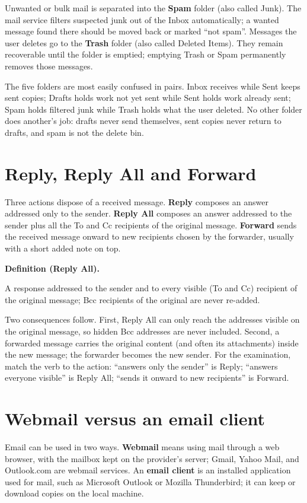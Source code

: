 \documentclass[11pt]{article}
\newenvironment{definitionbox}[1]{%
  \par\noindent\textbf{Definition (#1).}\ \itshape
}{\par\vspace{0.3em}}
\begin{document}
Unwanted or bulk mail is separated into the \textbf{Spam} folder (also called
Junk). The mail service filters suspected junk out of the Inbox automatically;
a wanted message found there should be moved back or marked ``not spam''.
Messages the user deletes go to the \textbf{Trash} folder (also called Deleted
Items). They remain recoverable until the folder is emptied; emptying Trash
or Spam permanently removes those messages.

The five folders are most easily confused in pairs. Inbox receives while Sent
keeps sent copies; Drafts holds work not yet sent while Sent holds work
already sent; Spam holds filtered junk while Trash holds what the user deleted.
No other folder does another's job: drafts never send themselves, sent copies
never return to drafts, and spam is not the delete bin.

\section{Reply, Reply All and Forward}
Three actions dispose of a received message. \textbf{Reply} composes an answer
addressed only to the sender. \textbf{Reply All} composes an answer addressed
to the sender plus all the To and Cc recipients of the original message.
\textbf{Forward} sends the received message onward to new recipients chosen
by the forwarder, usually with a short added note on top.

\begin{definitionbox}{Reply All}
A response addressed to the sender and to every visible (To and Cc)
recipient of the original message; Bcc recipients of the original are never
re-added.
\end{definitionbox}

Two consequences follow. First, Reply All can only reach the addresses visible
on the original message, so hidden Bcc addresses are never included. Second,
a forwarded message carries the original content (and often its attachments)
inside the new message; the forwarder becomes the new sender. For the
examination, match the verb to the action: ``answers only the sender'' is
Reply; ``answers everyone visible'' is Reply All; ``sends it onward to new
recipients'' is Forward.

\section{Webmail versus an email client}
Email can be used in two ways. \textbf{Webmail} means using mail through a
web browser, with the mailbox kept on the provider's server; Gmail, Yahoo
Mail, and Outlook.com are webmail services. An \textbf{email client} is an
installed application used for mail, such as Microsoft Outlook or Mozilla
Thunderbird; it can keep or download copies on the local machine.
\end{document}
